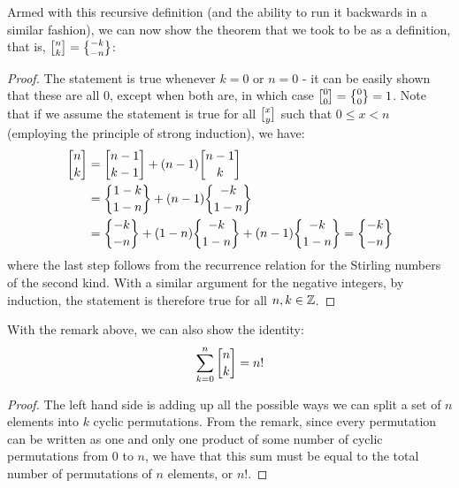 Armed with this recursive definition (and the ability to run it backwards in a similar fashion), we can now show the theorem that we took to be as a definition, that is, $\stiri{n}{k} = \stirii{-k}{-n}$: 
\begin{proof}
The statement is true whenever $k = 0$ or $n = 0$ - it can be easily shown that these are all $0$, except when both are, in which case $\stiri{0}{0} = \stirii{0}{0} = 1$. Note that if we assume the statement is true for all $\stiri{x}{y}$ such that $0 \leq x < n$ (employing the principle of strong induction), we have:
\begin{align*}
\dstiri{n}{k} &= \dstiri{n-1}{k-1} + (n-1) \dstiri{n-1}{k} \\
&= \dstirii{1-k}{1-n} + (n-1) \dstirii{-k}{1-n} \\
&= \dstirii{-k}{-n} + (1-n) \dstirii{-k}{1-n} + (n-1) \dstirii{-k}{1-n} = \dstirii{-k}{-n}
\end{align*}
where the last step follows from the recurrence relation for the Stirling numbers of the second kind. With a similar argument for the negative integers, by induction, the statement is therefore true for all $n, k \in \mathbb{Z}$. 
\end{proof} 

With the remark above, we can also show the identity: 
\[
	\sum_{k=0}^n \dstiri{n}{k} = n! 
\]	

\begin{proof}
	The left hand side is adding up all the possible ways we can split a set of $n$ elements into $k$ cyclic permutations. From the remark, since every permutation can be written as one and only one product of some number of cyclic permutations from $0$ to $n$, we have that this sum must be equal to the total number of permutations of $n$ elements, or $n!$. 
\end{proof}



% 
